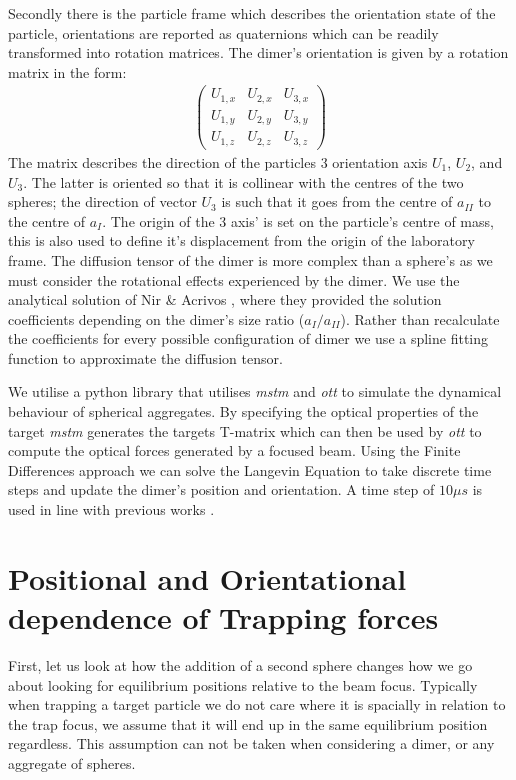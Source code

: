Secondly there is the particle frame which describes the orientation 
state of the particle, orientations are reported as quaternions which 
can be readily transformed into rotation matrices. The dimer's 
orientation is given by a rotation matrix in the form: 
\begin{align}
	\begin{pmatrix}
		U_{1,x} & U_{2,x} & U_{3,x} \\
		U_{1,y} & U_{2,y} & U_{3,y} \\
		U_{1,z} & U_{2,z} & U_{3,z}
	\end{pmatrix}
\end{align}
The matrix describes the direction of the particles 3 orientation 
axis $U_1$, $U_2$, and $U_3$. The latter is oriented so that it 
is collinear with the centres of the two spheres; the direction 
of vector $U_3$ is such that it goes from the centre of $a_{II}$ 
to the centre of $a_{I}$. The origin of the 3 axis' is set on the 
particle's centre of mass, this is also used to define it's 
displacement from the origin of the laboratory frame. The diffusion 
tensor of the dimer is more complex than a sphere's as we must 
consider the rotational effects experienced by the dimer. We use 
the analytical solution of Nir \& Acrivos \cite{Nir1973}, where 
they provided the solution coefficients depending on the dimer's 
size ratio ($a_I/a_{II}$). Rather than recalculate the coefficients 
for every possible configuration of dimer we use a spline fitting 
function to approximate the diffusion tensor. 

We utilise a python library that utilises \textit{mstm} and
\textit{ott} to simulate the dynamical behaviour of spherical
aggregates. By specifying the optical properties of the target 
\textit{mstm} generates the targets T-matrix which can then be 
used by \textit{ott} to compute the optical forces generated by 
a focused beam. Using the Finite Differences approach we can solve
the Langevin Equation to take discrete time steps and update the 
dimer's position and orientation. A time step of $10 \mu s$ is 
used in line with previous works \cite{Vigilante2020}.

\section{Positional and Orientational dependence of Trapping forces}
\label{sec:eq_positions}
First, let us look at how the addition of a second sphere
changes how we go about looking for equilibrium positions
relative to the beam focus. Typically when trapping a target
particle we do not care where it is spacially in relation 
to the trap focus, we assume that it will end up in the same 
equilibrium position regardless. This assumption can not 
be taken when considering a dimer, or any aggregate of spheres.  

